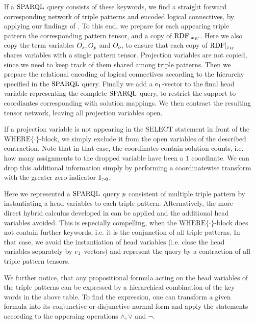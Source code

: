 If a $\mathrm{SPARQL}$ query consists of these keywords, we find a straight forward corresponding network of triple patterns and encoded logical connectives, by applying our findings of .
To this end, we prepare for each appearing triple pattern the corresponding pattern tensor, and a copy of ${\mathrm{RDF}}|_{x_{W}}$.
Here we also copy the term variables $O_{s},O_{p}$ and $O_{o}$, to ensure that each copy of ${\mathrm{RDF}}|_{x_{W}}$ shares variables with a single pattern tensor.
Projection variables are not copied, since we need to keep track of them shared among triple patterns.
Then we prepare the relational encoding of logical connectives according to the hierarchy specified in the $\mathrm{SPARQL}$ query.
Finally we add a $e_1$-vector to the final head variable representing the complete $\mathrm{SPARQL}$ query, to restrict the support to coordiantes corresponding with solution mappings.
We then contract the resulting tensor network, leaving all projection variables open.

If a projection variable is not appearing in the $\mathrm{SELECT}$ statement in front of the $\mathrm{WHERE}\{\cdot\}$-block, we simply exclude it from the open variables of the described contraction.
Note that in that case, the coordinates contain solution counts, i.e. how many assignments to the dropped variable have been a $1$ coordinate.
We can drop this additional information simply by performing a coordinatewise transform with the greater zero indicator $\mathbb{I}_{>0}$.

Here we represented a $\mathrm{SPARQL}$ query $p$ consistent of multiple triple pattern by instantiating a head variables to each triple pattern.
Alternatively, the more direct hybrid calculus developed in  can be applied and the additional head variables avoided.
This is especially compelling, when the $\mathrm{WHERE}\{\cdot\}$-block does not contain further keywords, i.e. it is the conjunction of all triple patterns.
In that case, we avoid the instantiation of head variables (i.e. close the head variables separately by $e_1$-vectors) and represent the query by a contraction of all triple pattern tensors.

We further notice, that any propositional formula acting on the head variables of the triple patterns can be expressed by a hierarchical combination of the key words in the above table.
To find the expression, one can transform a given formula into its conjunctive or disjunctive normal form and apply the statements according to the apperaing operations $\land,\lor$ and $\lnot$.


